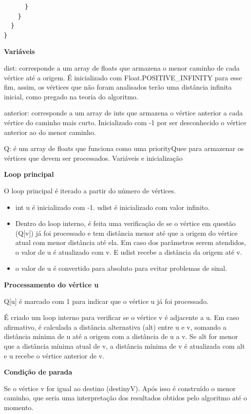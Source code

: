 \documentclass[
	12pt,				%
	oneside,			%
	a4paper,			%
	english,			%
	brazil,				%
	]{abntex2}
\begin{document}
{\begin{lstlisting}
      }
    }
  }
}
\end{lstlisting}

\textbf{Variáveis}

dist: corresponde a um array de floats que armazena o menor caminho de cada vértice até a origem. É inicializado com Float.POSITIVE\_INFINITY para esse fim, assim, os vértices que não foram analisados terão uma distância infinita inicial, como pregado na teoria do algoritmo.


anterior: corresponde a um array de ints que armazena o vértice anterior a cada vértice do caminho mais curto. Inicializado com -1 por ser desconhecido o vértice anterior ao do menor caminho.

Q: é um array de floats que funciona como uma priorityQuee para armazenar os vértices que devem ser processados.
Variáveis e inicialização

\textbf{Loop principal}

O loop principal é iterado a partir do número de vértices.

\begin{itemize}
\item int u é inicializado com -1. udist é inicializado com valor infinito.
\item Dentro do loop interno, é feita uma verificação de se o vértice em questão (Q[v]) já foi processado e tem distância menor até que a origem do vértice atual com menor distância até ela. Em caso dos parâmetros serem atendidos, o valor de u é atualizado com v. E udist recebe a distância da origem até v.
\item o valor de u é convertido para absoluto para evitar problemas de sinal.
\end{itemize}

\textbf{Processamento do vértice u}

Q[u] é marcado com 1 para indicar que o vértice u já foi processado.

É criado um loop interno para verificar se o vértice v é adjacente a u. Em caso afirmativo, é calculada a distância alternativa (alt) entre u e v, somando a distância mínima de u até a origem com a distância de u a v.
Se alt for menor que a distância mínima atual de v, a distância mínima de v é atualizada com alt e u recebe o vértice anterior de v.

\textbf{Condição de parada}

Se o vértice v for igual ao destino (destinyV). Após isso é construído o menor caminho, que seria uma interpretação dos resultados obtidos pelo algoritmo até o momento.

}
\end{document}
